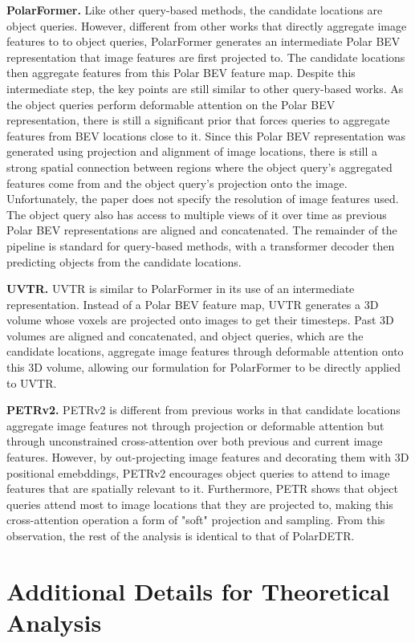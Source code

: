 \documentclass[runningheads, hyperfootnotes=false]{article}
\begin{document}
\noindent\textbf{PolarFormer.} Like other query-based methods, the candidate locations are object queries. However, different from other works that directly aggregate image features to to object queries, PolarFormer generates an intermediate Polar BEV representation that image features are first projected to. The candidate locations then aggregate features from this Polar BEV feature map. Despite this intermediate step, the key points are still similar to other query-based works. As the object queries perform deformable attention on the Polar BEV representation, there is still a significant prior that forces queries to aggregate features from BEV locations close to it. Since this Polar BEV representation was generated using projection and alignment of image locations, there is still a strong spatial connection between regions where the object query's aggregated features come from and the object query's projection onto the image. Unfortunately, the paper does not specify the resolution of image features used. The object query also has access to multiple views of it over time as previous Polar BEV representations are aligned and concatenated. The remainder of the pipeline is standard for query-based methods, with a transformer decoder then predicting objects from the candidate locations.

\noindent\textbf{UVTR.} UVTR is similar to PolarFormer in its use of an intermediate representation. Instead of a Polar BEV feature map, UVTR generates a 3D volume whose voxels are projected onto images to get their timesteps. Past 3D volumes are aligned and concatenated, and object queries, which are the candidate locations, aggregate image features through deformable attention onto this 3D volume, allowing our formulation for PolarFormer to be directly applied to UVTR.

\noindent\textbf{PETRv2.} PETRv2 is different from previous works in that candidate locations aggregate image features not through projection or deformable attention but through unconstrained cross-attention over both previous and current image features. However, by out-projecting image features and decorating them with 3D positional emebddings, PETRv2 encourages object queries to attend to image features that are spatially relevant to it. Furthermore, PETR shows that object queries attend most to image locations that they are projected to, making this cross-attention operation a form of "soft" projection and sampling. From this observation, the rest of the analysis is identical to that of PolarDETR. \section{Additional Details for Theoretical Analysis}\label{app:theory}
\end{document}
